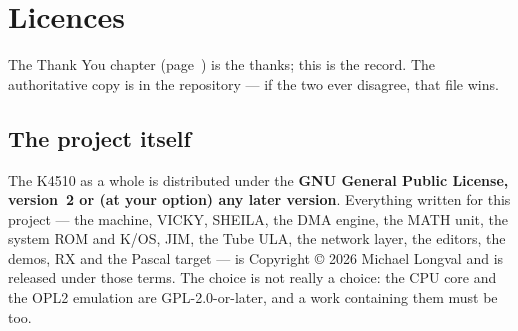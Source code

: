 \chapter{Licences}\label{cha:licences}

The Thank You chapter (page~\pageref{cha:thanks}) is the thanks; this
is the record. The
authoritative copy is  in the repository --- if the
two ever disagree, that file wins.

\section{The project itself}
The K4510 as a whole is distributed under the \textbf{GNU General
Public License, version~2 or (at your option) any later version}.
Everything written for this project --- the machine, VICKY, SHEILA,
the DMA engine, the MATH unit, the system ROM and K/OS, JIM, the Tube
ULA, the network layer, the editors, the demos, RX and the Pascal
target --- is Copyright \copyright{} 2026 Michael
Longval and is released under those terms. The choice is not really a
choice: the CPU core and the OPL2 emulation are GPL-2.0-or-later, and a
work containing them must be too.

